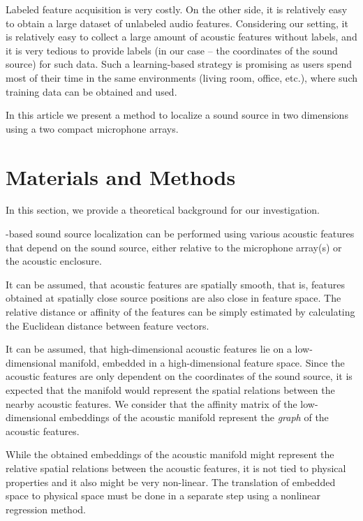 \documentclass[applsci,article,submit,moreauthors,pdftex]{Definitions/mdpi}
\begin{document}
Labeled feature acquisition is very costly.
On the other side, it is relatively easy to obtain a large dataset of unlabeled audio features. 
Considering our setting, it is relatively easy to collect a large amount of acoustic features without labels, and it is very tedious to provide labels (in our case -- the coordinates of the sound source) for such data. Such a learning-based strategy is promising as users spend most of their time in the same environments (living room, office, etc.), where such training data can be obtained and used.


In this article we present a method to localize a sound source in two dimensions using a two compact microphone arrays. 

\section{Materials and Methods}

In this section, we provide a theoretical background for our investigation.

\ann{}-based sound source localization can be performed using various acoustic features that depend on the sound source, either relative to the microphone array(s) or the acoustic enclosure.

It can be assumed, that acoustic features are spatially smooth, that is, features obtained at spatially close source positions are also close in feature space. The relative distance or affinity of the features can be simply estimated by calculating the Euclidean distance between feature vectors. 

It can be assumed, that high-dimensional acoustic features lie on a low-dimensional manifold, embedded in a high-dimensional feature space. 
Since the acoustic features are only dependent on the coordinates of the sound source, it is expected that the manifold would represent the spatial relations between the nearby acoustic features. 
We consider that the affinity matrix of the low-dimensional embeddings of the acoustic manifold represent the \emph{graph} of the acoustic features.

While the obtained embeddings of the acoustic manifold might represent the relative spatial relations between the acoustic features, it is not tied to physical properties and it also might be very non-linear. The translation of embedded space to physical space must be done in a separate step using a nonlinear regression method. 
\end{document}
